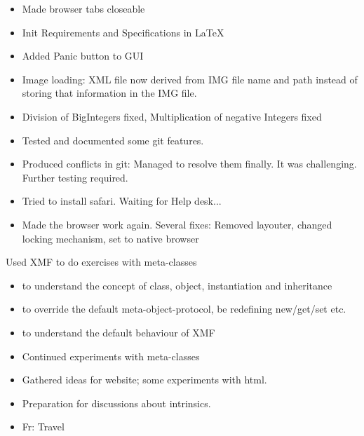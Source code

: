 \setcounter{section}{14}
\setcounter{subsection}{36}

\begin{itemize}
\item Made browser tabs closeable
\item Init Requirements and Specifications in LaTeX
\item Added Panic button to GUI
\item Image loading: XML file now derived from IMG file name and path instead of storing
that information in the IMG file.
\item Division of BigIntegers fixed, Multiplication of negative Integers fixed
\end{itemize}

\begin{itemize}
\item Tested and documented some git features.
\item Produced conflicts in git: Managed to resolve them finally. It was challenging. Further
testing required.
\item Tried to install safari. Waiting for Help desk...
\item Made the browser work again. Several fixes: Removed layouter, changed locking mechanism,
set to native browser
\end{itemize}

Used XMF to do exercises with meta-classes \begin{itemize} 
\item to understand the concept of class, object, instantiation and inheritance
\item to override the default meta-object-protocol, be redefining new/get/set etc.
\item to understand the default behaviour of XMF
\end{itemize}

\begin{itemize} 
\item Continued experiments with meta-classes
\item Gathered ideas for website; some experiments with html.
\end{itemize}

\begin{itemize} 
\item Preparation for discussions about intrinsics.
\item Fr: Travel
\end{itemize}


